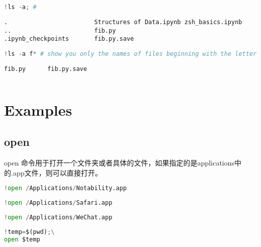 \documentclass[
]{article}
\begin{document}
\hypertarget{0e93f1a0}{}
\begin{lstlisting}[language=Python]
!ls -a; #
\end{lstlisting}

\begin{lstlisting}
.                        Structures of Data.ipynb zsh_basics.ipynb
..                       fib.py
.ipynb_checkpoints       fib.py.save
\end{lstlisting}

\hypertarget{2b2a76af}{}
\begin{lstlisting}[language=Python]
!ls -a f* # show you only the names of files beginning with the letter f
\end{lstlisting}

\begin{lstlisting}
fib.py      fib.py.save
\end{lstlisting}

\hypertarget{84684b9b}{}
\begin{lstlisting}[language=Python]
\end{lstlisting}

\hypertarget{af360aad}{}
\hypertarget{examples}{%
\section{Examples}\label{examples}}

\hypertarget{9de924ca}{}
\hypertarget{open}{%
\subsection{open}\label{open}}

open
命令用于打开一个文件夹或者具体的文件，如果指定的是applications中的.app文件，则可以直接打开。

\hypertarget{174159de}{}
\begin{lstlisting}[language=Python]
!open /Applications/Notability.app 
\end{lstlisting}

\hypertarget{025763cf}{}
\begin{lstlisting}[language=Python]
!open /Applications/Safari.app
\end{lstlisting}

\hypertarget{81284268}{}
\begin{lstlisting}[language=Python]
!open /Applications/WeChat.app
\end{lstlisting}

\hypertarget{cc31e69f}{}
\begin{lstlisting}[language=Python]
!temp=$(pwd);\
open $temp
\end{lstlisting}
\end{document}
